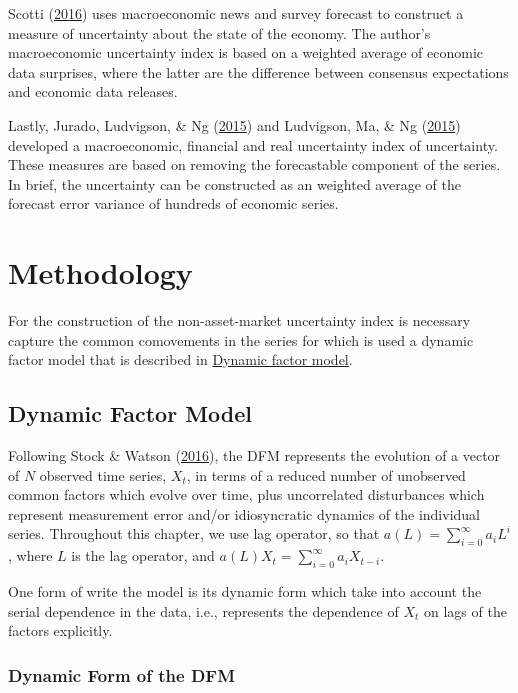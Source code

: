 \documentclass[12pt,twoside]{reedthesis}
\begin{document}
Scotti (\protect\hyperlink{ref-scotti:2016}{2016}) uses macroeconomic news and survey forecast to construct a measure of uncertainty about the state of the economy. The author's macroeconomic uncertainty index is based on a weighted average of economic data surprises, where the latter are the difference between consensus expectations and economic data releases.

Lastly, Jurado, Ludvigson, \& Ng (\protect\hyperlink{ref-juraludvng:2015}{2015}) and Ludvigson, Ma, \& Ng (\protect\hyperlink{ref-ludvmang:2015}{2015}) developed a macroeconomic, financial and real uncertainty index of uncertainty. These measures are based on removing the forecastable component of the series. In brief, the uncertainty can be constructed as an weighted average of the forecast error variance of hundreds of economic series.

\hypertarget{methodology}{%
\chapter{Methodology}\label{methodology}}

For the construction of the non-asset-market uncertainty index is necessary capture the common comovements in the series for which is used a dynamic factor model that is described in \protect\hyperlink{dynamic-factor-model}{Dynamic factor model}.

\hypertarget{dynamic-factor-model}{%
\section{Dynamic Factor Model}\label{dynamic-factor-model}}

Following Stock \& Watson (\protect\hyperlink{ref-stocwats:2016}{2016}), the DFM represents the evolution of a vector of \(N\) observed time series, \(X_{t}\), in terms of a reduced number of unobserved common factors which evolve over time, plus uncorrelated disturbances which represent measurement error and/or idiosyncratic dynamics of the individual series. Throughout this chapter, we use lag operator, so that \(a(L) = \sum_{i = 0}^{\infty} a_{i}L^{i}\), where \(L\) is the lag operator, and \(a(L)X_{t} = \sum_{i = 0}^{\infty} a_{i}X_{t - i}\).

One form of write the model is its dynamic form which take into account the serial dependence in the data, i.e., represents the dependence of \(X_{t}\) on lags of the factors explicitly.

\hypertarget{dynamic-form-of-the-dfm}{%
\subsection{Dynamic Form of the DFM}\label{dynamic-form-of-the-dfm}}
\end{document}

